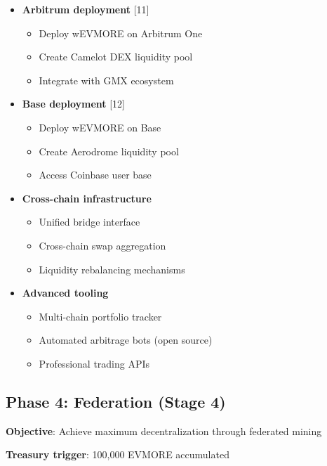\documentclass[11pt,a4paper]{article}
\begin{document}
\begin{itemize}
    \item \textbf{Arbitrum deployment} [11]
    \begin{itemize}
        \item Deploy wEVMORE on Arbitrum One
        \item Create Camelot DEX liquidity pool
        \item Integrate with GMX ecosystem
    \end{itemize}
    \item \textbf{Base deployment} [12]
    \begin{itemize}
        \item Deploy wEVMORE on Base
        \item Create Aerodrome liquidity pool
        \item Access Coinbase user base
    \end{itemize}
    \item \textbf{Cross-chain infrastructure}
    \begin{itemize}
        \item Unified bridge interface
        \item Cross-chain swap aggregation
        \item Liquidity rebalancing mechanisms
    \end{itemize}
    \item \textbf{Advanced tooling}
    \begin{itemize}
        \item Multi-chain portfolio tracker
        \item Automated arbitrage bots (open source)
        \item Professional trading APIs
    \end{itemize}
\end{itemize}

\subsection{Phase 4: Federation (Stage 4)}

\textbf{Objective}: Achieve maximum decentralization through federated mining

\textbf{Treasury trigger}: 100,000 EVMORE accumulated
\end{document}
